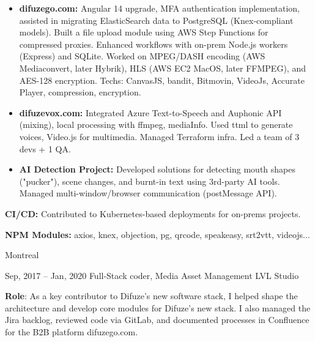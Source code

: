 \documentclass[
  a4paper,
   maincolor=cvblue,
   sectioncolor=cvblue,
   sidebarwidth=0.323\paperwidth,
]{fortysecondscv}
\begin{document}
\begin{cvtableNew}
{        \begin{itemize}[itemsep=-1mm, topsep=0pt, leftmargin=8pt]
          \item \textbf{difuzego.com:} Angular 14 upgrade, MFA authentication implementation, assisted in migrating ElasticSearch data to PostgreSQL (Knex-compliant models). Built a file upload module using AWS Step Functions for compressed proxies. Enhanced workflows with on-prem Node.js workers (Express) and SQLite. Worked on MPEG/DASH encoding (AWS Mediaconvert, later Hybrik), HLS (AWS EC2 MacOS, later FFMPEG), and AES-128 encryption. Techs: CanvasJS, bandit, Bitmovin, VideoJs, Accurate Player, compression, encryption.\vspace{5pt}
          \item \textbf{difuzevox.com:} Integrated Azure Text-to-Speech and Auphonic API (mixing), local processing with ffmpeg, mediaInfo. Used ttml to generate voices, Video.js for multimedia. Managed Terraform infra. Led a team of 3 devs + 1 QA.\vspace{5pt}
          \item \textbf{AI Detection Project:} Developed solutions for detecting mouth shapes ("pucker"), scene changes, and burnt-in text using 3rd-party AI tools. Managed multi-window/browser communication (postMessage API).\vspace{5pt}
        \end{itemize}

        \textbf{CI/CD:} Contributed to Kubernetes-based deployments for on-prems projects.\vspace{5pt}

        \textbf{NPM Modules:} axios, knex, objection, pg, qrcode, speakeasy, srt2vtt, videojs...
      }
      {Montreal} %

      \vspace{1.6mm} %



  \cvitemRightNew
    {Sep, 2017 – Jan, 2020} %
    {Full-Stack coder, Media Asset Management} %
    {LVL Studio} %
      {
        \vspace{0.2pt} %
        \fontsize{10.8pt}{12pt}\selectfont %
        \textbf{Role}: As a key contributor to Difuze’s new software stack, I  helped shape the architecture and develop core modules for Difuze’s new stack. I also managed the Jira backlog, reviewed code via GitLab, and documented processes in Confluence for the B2B platform difuzego.com.\vspace{5pt}

}
\end{cvtableNew}
\end{document}
